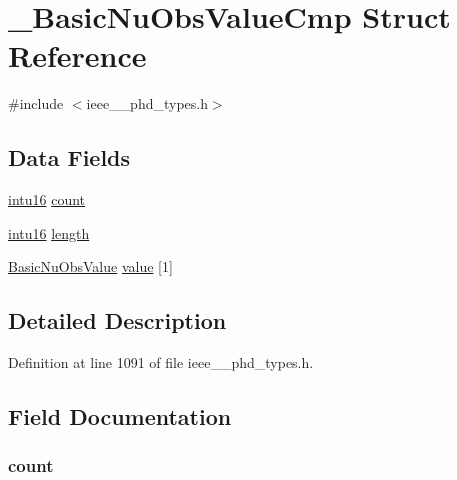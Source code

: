 \hypertarget{struct___basic_nu_obs_value_cmp}{}\section{\+\_\+\+Basic\+Nu\+Obs\+Value\+Cmp Struct Reference}
\label{struct___basic_nu_obs_value_cmp}


{\ttfamily \#include $<$ieee\+\_\+\_\+phd\+\_\+types.\+h$>$}

\subsection*{Data Fields}
\begin{DoxyCompactItemize}
\item 
\hyperlink{ieee__11073__phd__types_8h_a3561595d2aa7416532e1c9910abd076d}{intu16} \hyperlink{struct___basic_nu_obs_value_cmp_abf6db060ae8e224764b0f867fb135ecd}{count}
\item 
\hyperlink{ieee__11073__phd__types_8h_a3561595d2aa7416532e1c9910abd076d}{intu16} \hyperlink{struct___basic_nu_obs_value_cmp_a3743679e4ff85e3e1b3fc2e59973fbb3}{length}
\item 
\hyperlink{ieee__11073__phd__types_8h_a3430df9e393de4554fb96eb0a6334b87}{Basic\+Nu\+Obs\+Value} \hyperlink{struct___basic_nu_obs_value_cmp_a6076b90dee0eebf5dbcc2209d318301d}{value} \mbox{[}1\mbox{]}
\end{DoxyCompactItemize}


\subsection{Detailed Description}


Definition at line 1091 of file ieee\+\_\+\_\+phd\+\_\+types.\+h.



\subsection{Field Documentation}
\hypertarget{struct___basic_nu_obs_value_cmp_abf6db060ae8e224764b0f867fb135ecd}{}
\subsubsection[{count}]{ count}\label{struct___basic_nu_obs_value_cmp_abf6db060ae8e224764b0f867fb135ecd}


